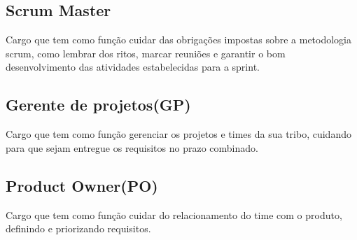 \subsection{Scrum Master}

Cargo que tem como função cuidar das obrigações impostas sobre a metodologia scrum, como lembrar dos ritos, marcar reuniões e garantir o bom desenvolvimento das atividades estabelecidas para a sprint.

\subsection{Gerente de projetos(GP)}

Cargo que tem como função gerenciar os projetos e times da sua
 tribo, cuidando para que sejam entregue os requisitos no prazo combinado.

\subsection{Product Owner(PO)}
Cargo que tem como função cuidar do relacionamento do time com o produto,
 definindo e priorizando requisitos.

 \cite{Franca2001}